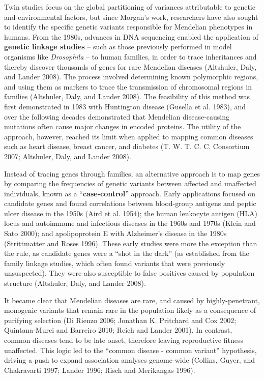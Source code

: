 \documentclass[
]{book}
\begin{document}
Twin studies focus on the global partitioning of variances attributable to genetic and environmental factors, but since Morgan's work, researchers have also sought to identify the specific genetic variants responsible for Mendelian phenotypes in humans. From the 1980s, advances in DNA sequencing enabled the application of \textbf{genetic linkage studies} -- such as those previously performed in model organisms like \emph{Drosophila} -- to human families, in order to trace inheritances and thereby discover thousands of genes for rare Mendelian diseases (Altshuler, Daly, and Lander 2008). The process involved determining known polymorphic regions, and using them as markers to trace the transmission of chromosomal regions in families (Altshuler, Daly, and Lander 2008). The feasibility of this method was first demonstrated in 1983 with Huntington disease (Gusella et al. 1983), and over the following decades demonstrated that Mendelian disease-causing mutations often cause major changes in encoded proteins. The utility of the approach, however, reached its limit when applied to mapping common diseases such as heart disease, breast cancer, and diabetes (T. W. T. C. C. Consortium 2007; Altshuler, Daly, and Lander 2008).

Instead of tracing genes through families, an alternative approach is to map genes by comparing the frequencies of genetic variants between affected and unaffected individuals, known as a ``\textbf{case-control}'' approach. Early applications focused on candidate genes and found correlations between blood-group antigens and peptic ulcer disease in the 1950s (Aird et al. 1954); the human leukocyte antigen (HLA) locus and autoimmune and infectious diseases in the 1960s and 1970s (Klein and Sato 2000); and apolipoprotein E with Alzheimer's disease in the 1980s (Strittmatter and Roses 1996). These early studies were more the exception than the rule, as candidate genes were a ``shot in the dark'' (as established from the family linkage studies, which often found variants that were previously unsuspected). They were also susceptible to false positives caused by population structure (Altshuler, Daly, and Lander 2008).

It became clear that Mendelian diseases are rare, and caused by highly-penetrant, monogenic variants that remain rare in the population likely as a consequence of purifying selection (Di Rienzo 2006; Jonathan K. Pritchard and Cox 2002; Quintana-Murci and Barreiro 2010; Reich and Lander 2001). In contrast, common diseases tend to be late onset, therefore leaving reproductive fitness unaffected. This logic led to the ``common disease - common variant'' hypothesis, driving a push to expand association analyses genome-wide (Collins, Guyer, and Chakravarti 1997; Lander 1996; Risch and Merikangas 1996).
\end{document}
